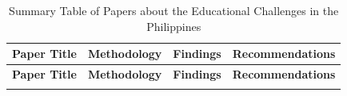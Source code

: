 
\begin{longtable}{|p{}|p{}|p{}|p{}|}
\hline
\textbf{Paper Title} & \textbf{Methodology} & \textbf{Findings} & \textbf{Recommendations} \\
\hline
\endfirsthead

\hline
\textbf{Paper Title} & \textbf{Methodology} & \textbf{Findings} & \textbf{Recommendations} \\
\hline
\endhead

\hline
\endfoot


\caption{Summary Table of Papers about the Educational Challenges in the Philippines}
\label{tab:educational_challenges}
\end{longtable}
